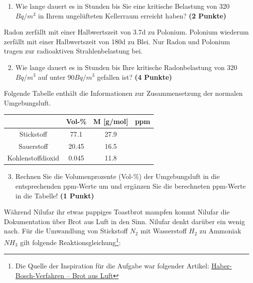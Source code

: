 \documentclass[a4paper, 9pt]{scrartcl}\usepackage[]{graphicx}\usepackage[]{xcolor}
\begin{document}
\vspace{-0.75cm}

\begin{enumerate}
\item Wie lange dauert es in Stunden bis Sie eine kritische Belastung von 320$Bq/m^3$ in Ihrem ungelüfteten Kellerraum erreicht haben? \textbf{(2 Punkte)}
\end{enumerate}

Radon zerfällt mit einer Halbwertszeit von 3.7d zu Polonium. Polonium wiederum zerfällt mit einer Halbwertszeit von 180d zu Blei. Nur Radon und Polonium tragen zur radioaktiven Strahlenbelastung bei.

\begin{enumerate}
  \setcounter{enumi}{1}
\item Wie lange dauert es in Stunden bis Ihre kritische Radonbelastung von
  320$Bq/m^3$ auf unter 90$Bq/m^3$ gefallen ist?
  \textbf{(4 Punkte)}
\end{enumerate}

Folgende Tabelle enthält die Informationen zur Zusammensetzung der normalen Umgebungsluft.

\begin{center}
  \begin{tabular}{ c|c|c|c }
     & Vol-\% & M [g/mol] & ppm \\
    \hline
    Stickstoff & 77.1 & 27.9 &
                                                    \phantom{1000000000000}\strut\\
        \hline
    Sauerstoff & 20.45 & 16.5 &
                                                    \phantom{10000000}\strut\\
        \hline
    Kohlenstoffdioxid & 0.045 & 11.8 & \phantom{10000000}\strut\\     
     \hline
\end{tabular}
\end{center}

\begin{enumerate}
   \setcounter{enumi}{2}
\item Rechnen Sie die Volumenprozente (Vol-\%) der Umgebungsluft in die entsprechenden ppm-Werte um und ergänzen Sie die berechneten ppm-Werte in die Tabelle!  \textbf{(1 Punkt)}
\end{enumerate}

Während Nilufar ihr etwas pappiges Toastbrot mampfen kommt Nilufar die Dokumentation über Brot aus Luft in den Sinn. Nilufar denkt darüber ein wenig nach. Für die Umwandlung von Stickstoff $N_2$ mit Wasserstoff $H_2$ zu Ammoniak $NH_3$ gilt folgende Reaktionsgleichung\footnote{Die Quelle der Inspiration für die Aufgabe war folgender Artikel: \href{https://www.gdch.de/netzwerk-strukturen/fachstrukturen/ag-chemie-und-gesellschaft/projekte-und-veranstaltungen/cartoons/haber-bosch-verfahren-brot-aus-luft.html}{Haber-Bosch-Verfahren – Brot aus Luft}}:
\end{document}
